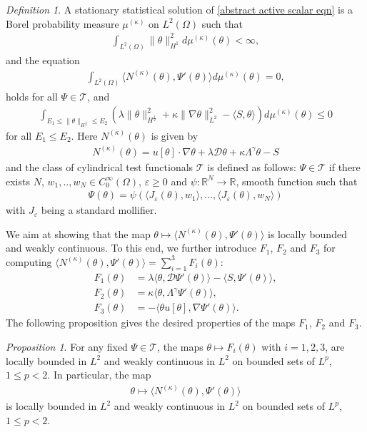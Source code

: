 \documentclass[reqno]{amsart}%
\theoremstyle{definition}
\theoremstyle{remark}
\numberwithin{equation}{section}
\newtheorem{definition}[theorem]{Definition}
\newtheorem{proposition}[theorem]{Proposition}
\newcommand{\1}{\mathbf{1}}
\newcommand{\R}{\mathbb R}
\numberwithin{equation}{section}
\numberwithin{theorem}{section}
\numberwithin{figure}{section}
\begin{document}
\begin{definition}
A stationary statistical solution of \eqref{abstract active scalar eqn} is a Borel probability measure $\mu^{(\kappa)}$ on $L^2(\Omega)$ such that
\begin{align*}
\int_{L^2(\Omega)}\|\theta\|_{H^1}^2d\mu^{(\kappa)}(\theta)<\infty,
\end{align*}
and the equation
\begin{align*}
\int_{L^2(\Omega)}\langle N^{(\kappa)}(\theta),\Psi'(\theta)\rangle d\mu^{(\kappa)}(\theta)=0,
\end{align*}
holds for all $\Psi\in\mathcal{T}$, and
\begin{align}\label{inequality on the integral on mu kappa>0}
\int_{E_1\le\|\theta\|_{H^\frac{1}{2}}\le E_2}(\lambda\|\theta\|_{H^\frac{1}{2}}^2+\kappa\|\nabla\theta\|_{L^2}^2-\langle S,\theta\rangle)d\mu^{(\kappa)}(\theta)\le 0
\end{align}
for all $E_1\le E_2$. Here $N^{(\kappa)}(\theta)$ is given by
\begin{align*}
N^{(\kappa)}(\theta)=u[\theta]\cdot\nabla\theta+\lambda\mathcal{D}\theta+\kappa\Lambda^{\gamma}\theta-S
\end{align*}
and the class of cylindrical test functionals $\mathcal{T}$ is defined as follows: $\Psi\in\mathcal{T}$ if there exists $N$, $w_1,..,w_N\in C^{\infty}_{0}(\Omega)$, $\varepsilon\ge0$ and $\psi:\R^N\to\R$, smooth function such that
\begin{align*}
\Psi(\theta)=\psi(\langle J_{\varepsilon}(\theta),w_1\rangle,...,\langle J_{\varepsilon}(\theta),w_N\rangle)
\end{align*}
with $J_{\varepsilon}$ being a standard mollifier.
\end{definition}
We aim at showing that the map $\theta\mapsto\langle N^{(\kappa)}(\theta),\Psi'(\theta)\rangle$ is locally bounded and weakly continuous. To this end, we further introduce $F_1$, $F_2$ and $F_3$ for computing $\langle N^{(\kappa)}(\theta),\Psi'(\theta)\rangle=\sum_{i=1}^3 F_i(\theta)$:
\begin{align*}
F_1(\theta)&=\lambda\langle\theta,\mathcal{D}\Psi'(\theta)\rangle - \langle S,\Psi'(\theta)\rangle,\\
F_2(\theta)&=\kappa\langle\theta,\Lambda^\gamma\Psi'(\theta)\rangle,\\
F_3(\theta)&=-\langle\theta u[\theta],\nabla\Psi'(\theta)\rangle.
\end{align*}
The following proposition gives the desired properties of the maps $F_1$, $F_2$ and $F_3$.
\begin{proposition}\label{weakly continuity of mu kappa prop}
For any fixed $\Psi\in\mathcal{T}$, the maps $\theta\mapsto F_i(\theta)$ with $i=1,2,3$, are locally bounded in $L^2$ and weakly continuous in $L^2$ on bounded sets of $L^p$, $1\le p<2$. In particular, the map
\begin{align}\label{nonlinear term map}
\theta\mapsto\langle N^{(\kappa)}(\theta),\Psi'(\theta)\rangle
\end{align}
is locally bounded in $L^2$ and weakly continuous in $L^2$ on bounded sets of $L^p$, $1\le p<2$.
\end{proposition}
\end{document}
